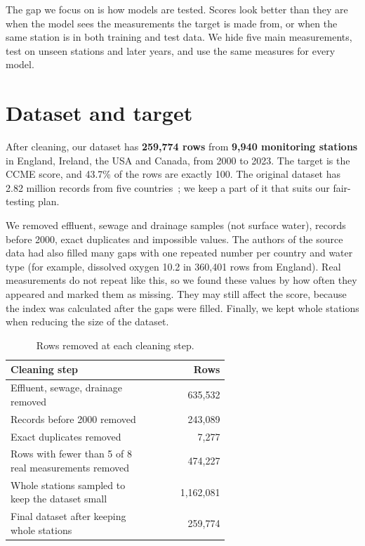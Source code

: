 \documentclass[conference]{IEEEtran}
\begin{document}
The gap we focus on is how models are tested. Scores look better than they are when the model sees the measurements the target is made from, or when the same station is in both training and test data. We hide five main measurements, test on unseen stations and later years, and use the same measures for every model.


\section{Dataset and target}
After cleaning, our dataset has \textbf{259,774 rows} from \textbf{9,940 monitoring stations} in England, Ireland, the USA and Canada, from 2000 to 2023. The target is the CCME score, and 43.7\% of the rows are exactly 100. The original dataset has 2.82 million records from five countries~\cite{karim2025}; we keep a part of it that suits our fair-testing plan.

We removed effluent, sewage and drainage samples (not surface water), records before 2000, exact duplicates and impossible values. The authors of the source data had also filled many gaps with one repeated number per country and water type (for example, dissolved oxygen 10.2 in 360,401 rows from England). Real measurements do not repeat like this, so we found these values by how often they appeared and marked them as missing. They may still affect the score, because the index was calculated after the gaps were filled. Finally, we kept whole stations when reducing the size of the dataset.

\begin{table}[!t]\caption{Rows removed at each cleaning step.}\centering
{\footnotesize\setlength{\tabcolsep}{3pt}\begin{tabular}{>{\raggedright\arraybackslash}p{0.62\linewidth}r}\toprule
\textbf{Cleaning step} & \textbf{Rows}\\\midrule
Effluent, sewage, drainage removed & 635,532\\
Records before 2000 removed & 243,089\\
Exact duplicates removed & 7,277\\
Rows with fewer than 5 of 8 real measurements removed & 474,227\\
Whole stations sampled to keep the dataset small & 1,162,081\\
Final dataset after keeping whole stations & 259,774\\
\bottomrule\end{tabular}}
\end{table}
\end{document}
